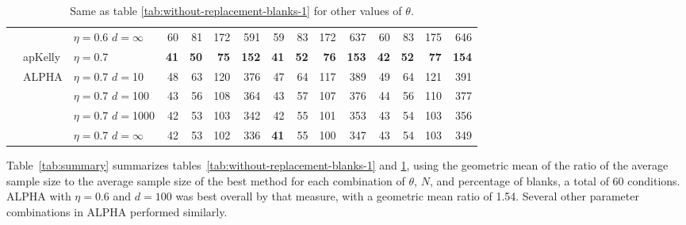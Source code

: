\documentclass[aoas]{imsart}
\begin{document}
\begin{table}
\begin{tabular}{lll|rrrr|rrrr|rrrr}
 &  & $\eta=$0.6 $d=\infty$ & 60  & 81  & 172  & 591  & 59  & 83  & 172  & 637  & 60  & 83  & 175  & 646  \\
\cline{2-15} & apKelly & $\eta=$0.7 & \bf{41}  & \bf{50}  & \bf{75}  & \bf{152}  & \bf{41}  & \bf{52}  & \bf{76}  & \bf{153}  & \bf{42}  & \bf{52}  & \bf{77}  & \bf{154}  \\
\cline{2-15}
& ALPHA & $\eta=$0.7 $d=$10 & 48  & 63  & 120  & 376  & 47  & 64  & 117  & 389  & 49  & 64  & 121  & 391  \\
&  & $\eta=$0.7 $d=$100 & 43  & 56  & 108  & 364  & 43  & 57  & 107  & 376  & 44  & 56  & 110  & 377  \\
&  & $\eta=$0.7 $d=$1000 & 42  & 53  & 103  & 342  & 42  & 55  & 101  & 353  & 43  & 54  & 103  & 356  \\
&  & $\eta=$0.7 $d=\infty$ & 42  & 53  & 102  & 336  & \bf{41}  & 55  & 100  & 347  & 43  & 54  & 103  & 349 
 \end{tabular}
\caption{\protect \label{tab:without-replacement-blanks-2}
Same as table \ref{tab:without-replacement-blanks-1} for other values of $\theta$.
}
\end{table}

Table~\ref{tab:summary} summarizes tables~\ref{tab:without-replacement-blanks-1} and \ref{tab:without-replacement-blanks-2},
using the geometric mean of the ratio of the average sample size to the 
average sample size of the best method for each combination of $\theta$, $N$, and percentage of blanks, a total
of 60 conditions.
ALPHA with $\eta=0.6$ and $d=100$ was best overall by that measure, with a geometric mean ratio of 1.54.
Several other parameter combinations in ALPHA performed similarly.
\end{document}
